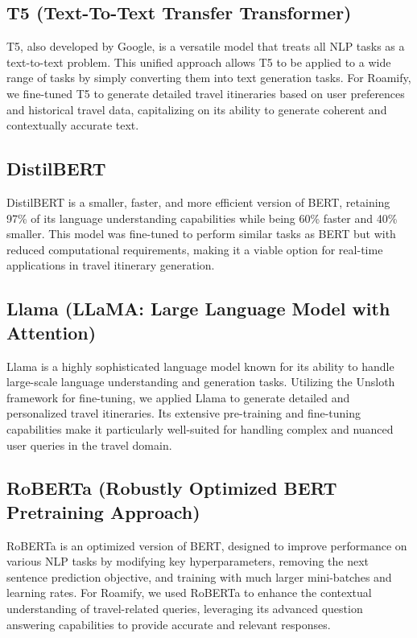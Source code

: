 \documentclass[conference]{IEEEtran}
\begin{document}
    \subsection{T5 (Text-To-Text Transfer Transformer)}
        T5, also developed by Google, is a versatile model that treats all NLP tasks as a text-to-text problem. This unified approach allows T5 to be applied to a wide range of tasks by simply converting them into text generation tasks. For Roamify, we fine-tuned T5 to generate detailed travel itineraries based on user preferences and historical travel data, capitalizing on its ability to generate coherent and contextually accurate text.

    \subsection{DistilBERT}
        DistilBERT is a smaller, faster, and more efficient version of BERT, retaining 97\% of its language understanding capabilities while being 60\% faster and 40\% smaller. This model was fine-tuned to perform similar tasks as BERT but with reduced computational requirements, making it a viable option for real-time applications in travel itinerary generation.

    \subsection{Llama (LLaMA: Large Language Model with Attention)}
        Llama is a highly sophisticated language model known for its ability to handle large-scale language understanding and generation tasks. Utilizing the Unsloth framework for fine-tuning, we applied Llama to generate detailed and personalized travel itineraries. Its extensive pre-training and fine-tuning capabilities make it particularly well-suited for handling complex and nuanced user queries in the travel domain.

    \subsection{RoBERTa (Robustly Optimized BERT Pretraining Approach)}
        RoBERTa is an optimized version of BERT, designed to improve performance on various NLP tasks by modifying key hyperparameters, removing the next sentence prediction objective, and training with much larger mini-batches and learning rates. For Roamify, we used RoBERTa to enhance the contextual understanding of travel-related queries, leveraging its advanced question answering capabilities to provide accurate and relevant responses.
\end{document}
